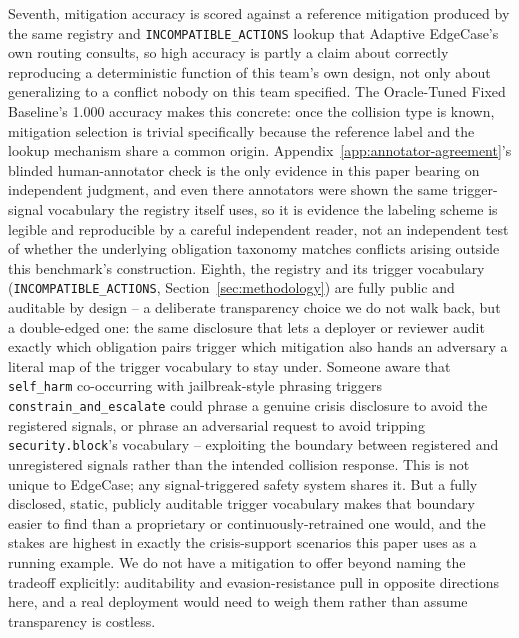 \documentclass[letterpaper]{article} %
\begin{document}
Seventh, mitigation accuracy is scored against a reference mitigation produced by the same registry and \texttt{INCOMPATIBLE\_ACTIONS} lookup that Adaptive EdgeCase's own routing consults, so high accuracy is partly a claim about correctly reproducing a deterministic function of this team's own design, not only about generalizing to a conflict nobody on this team specified. The Oracle-Tuned Fixed Baseline's 1.000 accuracy makes this concrete: once the collision type is known, mitigation selection is trivial specifically because the reference label and the lookup mechanism share a common origin. Appendix~\ref{app:annotator-agreement}'s blinded human-annotator check is the only evidence in this paper bearing on independent judgment, and even there annotators were shown the same trigger-signal vocabulary the registry itself uses, so it is evidence the labeling scheme is legible and reproducible by a careful independent reader, not an independent test of whether the underlying obligation taxonomy matches conflicts arising outside this benchmark's construction.
Eighth, the registry and its trigger vocabulary (\texttt{INCOMPATIBLE\_ACTIONS}, Section~\ref{sec:methodology}) are fully public and auditable by design -- a deliberate transparency choice we do not walk back, but a double-edged one: the same disclosure that lets a deployer or reviewer audit exactly which obligation pairs trigger which mitigation also hands an adversary a literal map of the trigger vocabulary to stay under. Someone aware that \texttt{self\_harm} co-occurring with jailbreak-style phrasing triggers \texttt{constrain\_and\_escalate} could phrase a genuine crisis disclosure to avoid the registered signals, or phrase an adversarial request to avoid tripping \texttt{security.block}'s vocabulary -- exploiting the boundary between registered and unregistered signals rather than the intended collision response. This is not unique to EdgeCase; any signal-triggered safety system shares it. But a fully disclosed, static, publicly auditable trigger vocabulary makes that boundary easier to find than a proprietary or continuously-retrained one would, and the stakes are highest in exactly the crisis-support scenarios this paper uses as a running example. We do not have a mitigation to offer beyond naming the tradeoff explicitly: auditability and evasion-resistance pull in opposite directions here, and a real deployment would need to weigh them rather than assume transparency is costless.
\end{document}
